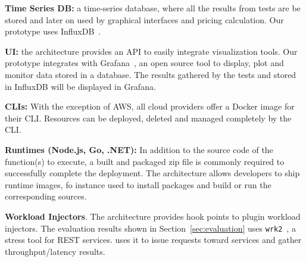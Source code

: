 \textbf{Time Series DB:} a time-series database, where all the results from tests are be stored and later on used by graphical interfaces and pricing calculation. Our prototype uses InfluxDB~\cite{influx}.

\textbf{UI:} the architecture provides an API to easily integrate visualization tools. Our prototype integrates with Grafana~\cite{grafana}, an open source tool to display, plot and monitor data stored in a database. 
The results gathered by the tests and stored in InfluxDB will be displayed in Grafana.

\textbf{CLIs:} With the exception of AWS, all cloud providers offer a Docker image for their \gls{CLI}. 
Resources can be deployed, deleted and managed completely by the \gls{CLI}.

\textbf{Runtimes (Node.js, Go, .NET):} In addition to the source code of the function(s) to execute, a built and packaged zip file is commonly required to successfully complete the deployment. 
The \sys architecture allows developers to ship runtime images, fo instance used to install packages and build or run the corresponding sources.


\textbf{Workload Injectors}. The architecture provides hook points to plugin workload injectors. The evaluation results shown in Section~\ref{sec:evaluation} uses \texttt{wrk2}~\cite{wrk2}, a stress tool for REST services. \sys uses it to issue requests toward services and gather throughput/latency results.

